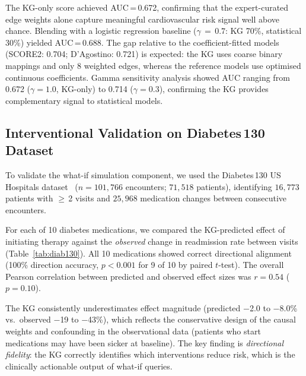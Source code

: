 \documentclass[runningheads]{llncs}
\begin{document}
The KG-only score achieved AUC\,=\,0.672, confirming that the
expert-curated edge weights alone capture meaningful
cardiovascular risk signal well above chance.
Blending with a logistic regression baseline
($\gamma\,=\,0.7$: KG 70\%, statistical 30\%) yielded
AUC\,=\,0.688.
The gap relative to the coefficient-fitted models
(SCORE2: 0.704; D'Agostino: 0.721) is expected: the KG uses
coarse binary mappings and only 8 weighted edges, whereas the
reference models use optimised continuous coefficients.
Gamma sensitivity analysis showed AUC ranging from 0.672
($\gamma\!=\!1.0$, KG-only) to 0.714 ($\gamma\!=\!0.3$),
confirming the KG provides complementary signal to statistical
models.

\subsection{Interventional Validation on Diabetes\,130 Dataset}\label{sec:diab130}

To validate the what-if simulation component, we used the
Diabetes\,130 US Hospitals dataset~\cite{strack2014diabetes130}
($n = 101{,}766$ encounters; $71{,}518$ patients), identifying
$16{,}773$ patients with $\geq$\,2 visits and $25{,}968$
medication changes between consecutive encounters.

For each of 10 diabetes medications, we compared the
KG-predicted effect of initiating therapy against the
\emph{observed} change in readmission rate between visits
(Table~\ref{tab:diab130}).
All 10 medications showed correct directional alignment
(100\% direction accuracy, $p < 0.001$ for 9 of 10 by
paired $t$-test).
The overall Pearson correlation between predicted and observed
effect sizes was $r = 0.54$ ($p = 0.10$).

The KG consistently underestimates effect magnitude (predicted
$-$2.0 to $-$8.0\% vs.\ observed $-$19 to $-$43\%), which
reflects the conservative design of the causal weights and
confounding in the observational data (patients who start
medications may have been sicker at baseline).
The key finding is \emph{directional fidelity}: the KG
correctly identifies which interventions reduce risk, which
is the clinically actionable output of what-if queries.
\end{document}
